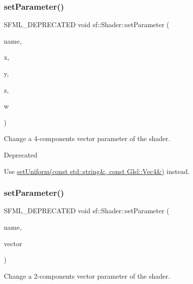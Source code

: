 \subsubsection{\texorpdfstring{set\+Parameter()}{setParameter()}\hspace{0.1cm}{\footnotesize\ttfamily [4/10]}}
{\footnotesize\ttfamily S\+F\+M\+L\+\_\+\+D\+E\+P\+R\+E\+C\+A\+T\+ED void sf\+::\+Shader\+::set\+Parameter (\begin{DoxyParamCaption}\item[{const std\+::string \&}]{name,  }\item[{float}]{x,  }\item[{float}]{y,  }\item[{float}]{z,  }\item[{float}]{w }\end{DoxyParamCaption})}



Change a 4-\/components vector parameter of the shader. 

\begin{DoxyRefDesc}{Deprecated}
\item[\hyperlink{deprecated__deprecated000008}{Deprecated}]Use \hyperlink{classsf_1_1_shader_abc1aee8343800680fd62e1f3d43c24bf}{set\+Uniform(const std\+::string\&, const Glsl\+::\+Vec4\&)} instead.\end{DoxyRefDesc}
\mbox{\label{classsf_1_1_shader_aee671dda9a84f607b9b780b2796def74}} 
\subsubsection{\texorpdfstring{set\+Parameter()}{setParameter()}\hspace{0.1cm}{\footnotesize\ttfamily [5/10]}}
{\footnotesize\ttfamily S\+F\+M\+L\+\_\+\+D\+E\+P\+R\+E\+C\+A\+T\+ED void sf\+::\+Shader\+::set\+Parameter (\begin{DoxyParamCaption}\item[{const std\+::string \&}]{name,  }\item[{const \hyperlink{classsf_1_1_vector2}{Vector2f} \&}]{vector }\end{DoxyParamCaption})}



Change a 2-\/components vector parameter of the shader. 

